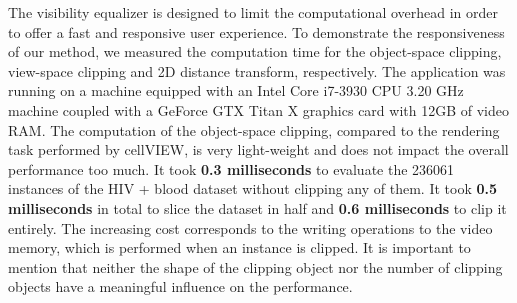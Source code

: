 

 

The visibility equalizer is designed to limit the computational overhead in order to offer a fast and responsive user experience.
To demonstrate the responsiveness of our method, we measured the computation time for the object-space clipping, view-space clipping and 2D distance transform, respectively.
The application was running on a machine equipped with an Intel Core i7-3930 CPU 3.20 GHz machine coupled with a GeForce GTX Titan X graphics card with 12GB of video RAM. 
The computation of the object-space clipping, compared to the rendering task performed by cellVIEW, is very light-weight and does not impact the overall performance too much. 
It took \textbf{0.3 milliseconds} to evaluate the 236061 instances of the HIV + blood dataset without clipping any of them.
It took \textbf{0.5 milliseconds} in total to slice the dataset in half and \textbf{0.6 milliseconds} to clip it entirely.
The increasing cost corresponds to the writing operations to the video memory, which is performed when an instance is clipped.
It is important to mention that neither the shape of the clipping object nor the number of clipping objects have a meaningful influence on the performance.

